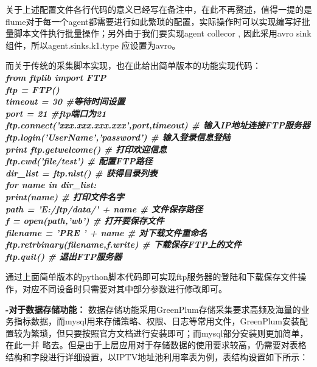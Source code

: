 \documentclass{HustGraduPaper}
\begin{document}
    关于上述配置文件各行代码的意义已经写在备注中，在此不再赘述，值得一提的是flume对于每一个agent都需要进行如此繁琐的配置，实际操作时可以实现编写好批量脚本文件执行批量操作；另外由于我们要实现agent collecor ,
    因此采用avro sink组件，所以agent.sinks.k1.type 应设置为avro。

    而关于传统的采集脚本实现，也在此给出简单版本的功能实现代码：\\
    {\songti \bfseries \itshape
    from ftplib import FTP\\
    ftp = FTP()  \\
    timeout = 30  \qquad \#等待时间设置\\ 
    port = 21      \qquad \#ftp端口为21\\
    ftp.connect('xxx.xxx.xxx.xxx',port,timeout) \qquad \# 输入IP地址连接FTP服务器  \\
    ftp.login('UserName','password') \qquad \# 输入登录信息登陆  \\
    print ftp.getwelcome()  \qquad \# 打印欢迎信息   \\
    ftp.cwd('file/test')    \qquad \# 配置FTP路径\\
    dir\_list = ftp.nlst()       \qquad \# 获得目录列表  \\
    for name in dir\_list:  \\
    print(name)             \qquad \# 打印文件名字  \\
    path = 'E:/ftp/data/' + name    \qquad \# 文件保存路径  \\
    f = open(path,'wb')         \qquad \# 打开要保存文件  \\
    filename = 'PRE ' + name   \qquad \# 对下载文件重命名 \\
    ftp.retrbinary(filename,f.write) \qquad \# 下载保存FTP上的文件  \\
    ftp.quit()                  \qquad \# 退出FTP服务器  
    }
    
    通过上面简单版本的python脚本代码即可实现ftp服务器的登陆和下载保存文件操作，对应不同设备时只需要对其中部分参数进行修改即可。
     
    {\songti \bfseries-对于数据存储功能：}
    数据存储功能采用GreenPlum存储采集要求高频及海量的业务指标数据，而mysql用来存储策略、权限、日志等常用文件，GreenPlum安装配置较为繁琐，但只要按照官方文档进行安装即可；而mysql部分安装则更加简单，在此一并
    略去。但是由于上层应用对于存储数据的使用要求较高，仍需要对表格结构和字段进行详细设置，以IPTV地址池利用率表为例，表结构设置如下所示：
\end{document}
